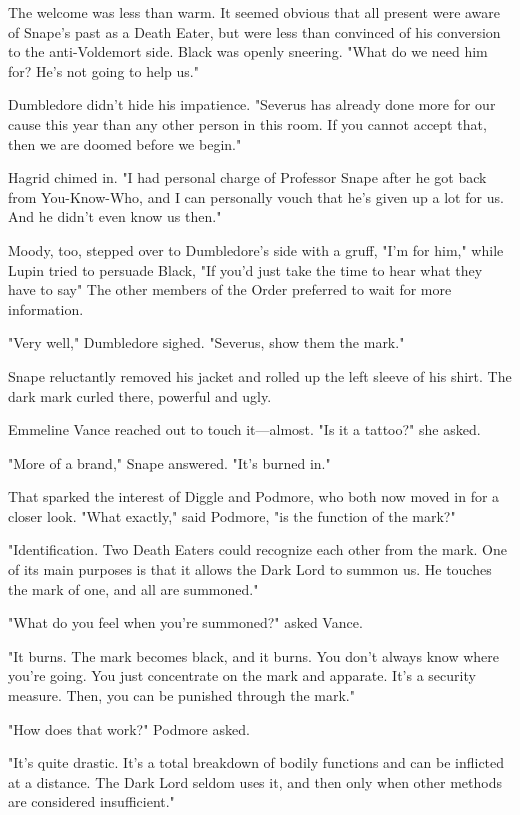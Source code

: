 The welcome was less than warm. It seemed obvious that all present were aware of Snape's past as a Death Eater, but were less than convinced of his conversion to the anti-Voldemort side. Black was openly sneering. "What do we need him for? He's not going to help us."

Dumbledore didn't hide his impatience. "Severus has already done more for our cause this year than any other person in this room. If you cannot accept that, then we are doomed before we begin."

Hagrid chimed in. "I had personal charge of Professor Snape after he got back from You-Know-Who, and I can personally vouch that he's given up a lot for us. And he didn't even know us then."

Moody, too, stepped over to Dumbledore's side with a gruff, "I'm for him," while Lupin tried to persuade Black, "If you'd just take the time to hear what they have to say{\el}" The other members of the Order preferred to wait for more information.

"Very well," Dumbledore sighed. "Severus, show them the mark."

Snape reluctantly removed his jacket and rolled up the left sleeve of his shirt. The dark mark curled there, powerful and ugly.

Emmeline Vance reached out to touch it—almost. "Is it a tattoo?" she asked.

"More of a brand," Snape answered. "It's burned in."

That sparked the interest of Diggle and Podmore, who both now moved in for a closer look. "What exactly," said Podmore, "is the function of the mark?"

"Identification. Two Death Eaters could recognize each other from the mark. One of its main purposes is that it allows the Dark Lord to summon us. He touches the mark of one, and all are summoned."

"What do you feel when you're summoned?" asked Vance.

"It burns. The mark becomes black, and it burns. You don't always know where you're going. You just concentrate on the mark and apparate. It's a security measure. Then, you can be punished through the mark."

"How does that work?" Podmore asked.

"It's quite drastic. It's a total breakdown of bodily functions and can be inflicted at a distance. The Dark Lord seldom uses it, and then only when other methods are considered insufficient."

